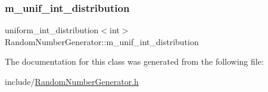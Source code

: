 \mbox{\label{class_random_number_generator_a7a3a5b9bfbb1306f364704bc3a9860b6}} 
\subsubsection{\texorpdfstring{m\+\_\+unif\+\_\+int\+\_\+distribution}{m\_unif\_int\_distribution}}
{\footnotesize\ttfamily uniform\+\_\+int\+\_\+distribution$<$int$>$ Random\+Number\+Generator\+::m\+\_\+unif\+\_\+int\+\_\+distribution\hspace{0.3cm}{\ttfamily [private]}}



The documentation for this class was generated from the following file\+:\begin{DoxyCompactItemize}
\item 
include/\hyperlink{_random_number_generator_8h}{Random\+Number\+Generator.\+h}\end{DoxyCompactItemize}
